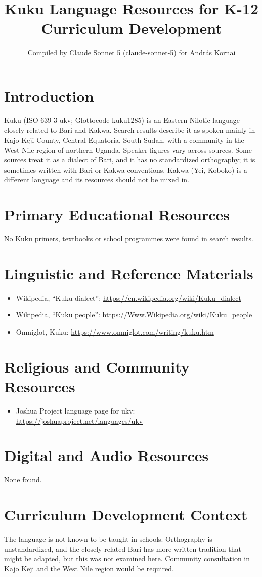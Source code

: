 \documentclass[12pt]{article}
\title{Kuku Language Resources for K-12 Curriculum Development}
\author{Compiled by Claude Sonnet 5 (claude-sonnet-5) for Andr\'as Kornai}
\date{}
\begin{document}
\maketitle

\section{Introduction}
Kuku (ISO 639-3 ukv; Glottocode kuku1285) is an Eastern Nilotic language closely related to Bari and Kakwa. Search results describe it as spoken mainly in Kajo Keji County, Central Equatoria, South Sudan, with a community in the West Nile region of northern Uganda. Speaker figures vary across sources. Some sources treat it as a dialect of Bari, and it has no standardized orthography; it is sometimes written with Bari or Kakwa conventions. Kakwa (Yei, Koboko) is a different language and its resources should not be mixed in.

\section{Primary Educational Resources}
No Kuku primers, textbooks or school programmes were found in search results.

\section{Linguistic and Reference Materials}
\begin{itemize}
\item Wikipedia, ``Kuku dialect'': \url{https://en.wikipedia.org/wiki/Kuku_dialect}
\item Wikipedia, ``Kuku people'': \url{https://Www.Wikipedia.org/wiki/Kuku_people}
\item Omniglot, Kuku: \url{https://www.omniglot.com/writing/kuku.htm}
\end{itemize}

\section{Religious and Community Resources}
\begin{itemize}
\item Joshua Project language page for ukv: \url{https://joshuaproject.net/languages/ukv}
\end{itemize}

\section{Digital and Audio Resources}
None found.

\section{Curriculum Development Context}
The language is not known to be taught in schools. Orthography is unstandardized, and the closely related Bari has more written tradition that might be adapted, but this was not examined here. Community consultation in Kajo Keji and the West Nile region would be required.
\end{document}

